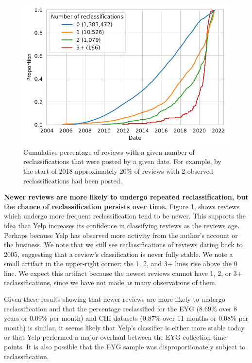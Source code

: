 \begin{figure}[t]
    \centering
    \includegraphics[width=0.9\columnwidth]{chapters/reviews/figures/reclassification_by_date_grouped_chicago.pdf}
    \caption[Cumulative percentage of reviews with a given number of reclassifications that were posted by a given date]{Cumulative percentage of reviews with a given number of reclassifications that were posted by a given date. For example, by the start of 2018 approximately 20\% of reviews with 2 observed reclassifications had been posted.}
    \label{fig:reclassification_by_date_chicago}
\end{figure}

\textbf{Newer reviews are more likely to undergo repeated reclassification, but the chance of reclassification persists over time.} Figure \ref{fig:reclassification_by_date_chicago}, shows reviews which undergo more frequent reclassification tend to be newer. This supports the idea that Yelp increases its confidence in classifying reviews as the reviews age. Perhaps because Yelp has observed more activity from the author's account or the business. We note that we still see reclassifications of reviews dating back to 2005, suggesting that a review's classification is never fully stable. We note a small artifact in the upper-right corner: the 1, 2, and 3+ lines rise above the 0 line. We expect this artifact because the newest reviews cannot have 1, 2, or 3+ reclassifications, since we have not made as many observations of them.

Given these results showing that newer reviews are more likely to undergo reclassification and that the percentage reclassified for the EYG (8.69\% over 8 years or 0.09\% per month) and CHI datasets (0.87\% over 11 months or 0.08\% per month) is similar, it seems likely that Yelp's classifier is either more stable today or that Yelp performed a major overhaul between the EYG collection time-points. It is also possible that the EYG sample was disproportionately subject to reclassification.

